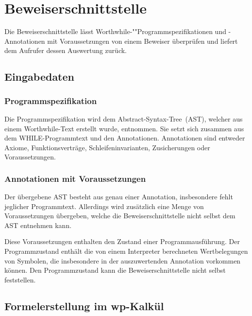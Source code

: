 \section{Beweiserschnittstelle}%

Die Beweiserschnittstelle lässt Worthwhile-""Programmspezifikationen
und -Annotationen mit Voraussetzungen von einem Beweiser überprüfen
und liefert dem Aufrufer dessen Auswertung zurück.%

\subsection{Eingabedaten}%

\subsubsection{Programmspezifikation}%


Die Programmspezifikation wird dem Abstract-Syntax-Tree~(AST), welcher
aus einem Worthwhile-Text erstellt wurde, entnommen. Sie setzt sich
zusammen aus dem WHILE-Programmtext und den Annotationen. Annotationen
sind entweder Axiome, Funktionsverträge, Schleifeninvarianten,
Zusicherungen oder Voraussetzungen.%

\subsubsection{Annotationen mit Voraussetzungen}%

Der übergebene AST besteht aus genau einer Annotation, insbesondere
fehlt jeglicher Programmtext. Allerdings wird zusätzlich eine Menge
von Voraussetzungen übergeben, welche die Beweiserschnittstelle nicht
selbst dem AST entnehmen kann.%


Diese Voraussetzungen enthalten den Zustand einer Programmausführung.
Der Programmzustand enthält
die von einem Interpreter berechneten Wertbelegungen von Symbolen, die
insbesondere in der auszuwertenden Annotation vorkommen können. Den
Programmzustand kann die Beweiserschnittstelle nicht selbst
feststellen.

\subsection{Formelerstellung im wp-Kalkül}%

